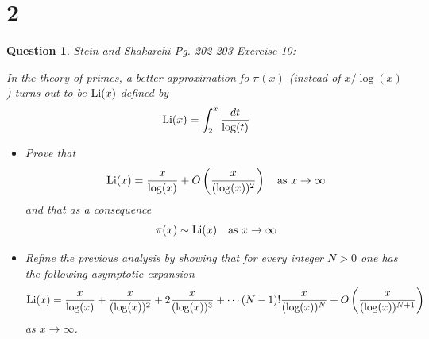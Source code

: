 \documentclass{article}
\newtheorem{question}{Question}
\begin{document}
\break

\section*{2}
\begin{myBox}[]{}
    \begin{question}
        Stein and Shakarchi Pg. 202-203 Exercise 10:

        In the theory of primes, a better approximation fo $\pi(x)$ (instead of $x/\log(x)$) turns out to be $\textmd{Li}(x)$ defined by 
        $$\textmd{Li}(x)=\int_{2}^{x}\frac{dt}{\log(t)}$$
        \begin{itemize}
            \item[(a)] Prove that 
            $$\textmd{Li}(x)=\frac{x}{\log(x)}+O\left(\frac{x}{(\log(x))^2}\right)\quad \textmd{as }x\rightarrow\infty$$
            and that as a consequence 
            $$\pi(x)\sim \textmd{Li}(x)\quad \textmd{as }x\rightarrow\infty$$
            \item[(b)] Refine the previous analysis by showing that for every integer $N>0$ one has the following asymptotic expansion 
            $$\textmd{Li}(x)=\frac{x}{\log(x)}+\frac{x}{(\log(x))^2}+2\frac{x}{(\log(x))^3}+\cdots (N-1)!\frac{x}{(\log(x))^N}+O\left(\frac{x}{(\log(x))^{N+1}}\right)$$
            as $x\rightarrow\infty$.
        \end{itemize}
    \end{question}
\end{myBox}
\end{document}
